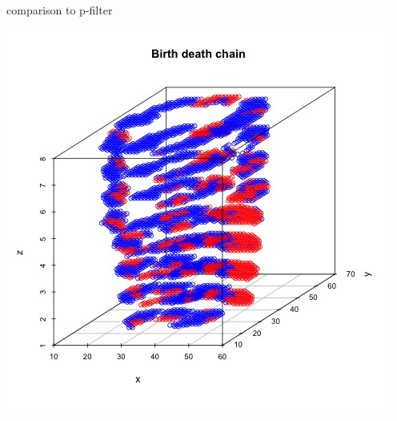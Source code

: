 \documentclass[10pt,mathserif]{beamer}
\begin{document}
\begin{frame}{comparison to p-filter}
\begin{center}
\includegraphics[height=0.35\textheight]{../BDC_predictions.jpg} \\ 
\end{center}
\end{frame}
\end{document}
